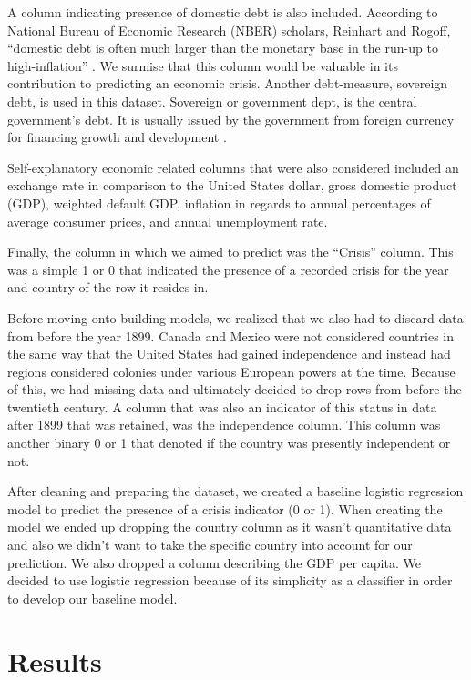 \documentclass[12pt]{article}
\begin{document}
A column indicating presence of domestic debt is also included. According to National Bureau of Economic Research (NBER) scholars, Reinhart and Rogoff, “domestic debt is often much larger than the monetary base in the run-up to high-inflation” \cite{nber}. We surmise that this column would be valuable in its contribution to predicting an economic crisis. Another debt-measure, sovereign debt, is used in this dataset. Sovereign or government dept, is the central government's debt. It is usually issued by the government from foreign currency for financing growth and development \cite{chensovereign}.

Self-explanatory economic related columns that were also considered included an exchange rate in comparison to the United States dollar, gross domestic product (GDP), weighted default GDP, inflation in regards to annual percentages of average consumer prices, and annual unemployment rate. 

Finally, the column in which we aimed to predict was the “Crisis” column. This was a simple 1 or 0 that indicated the presence of a recorded crisis for the year and country of the row it resides in.

Before moving onto building models, we realized that we also had to discard data from before the year 1899. Canada and Mexico were not considered countries in the same way that the United States had gained independence and instead had regions considered colonies under various European powers at the time. Because of this, we had missing data and ultimately decided to drop rows from before the twentieth century. A column that was also an indicator of this status in data after 1899 that was retained, was the independence column. This column was another binary 0 or 1 that denoted if the country was presently independent or not.

After cleaning and preparing the dataset, we created a baseline logistic regression model to predict the presence of a crisis indicator (0 or 1). When creating the model we ended up dropping the country column as it wasn’t quantitative data and also we didn’t want to take the specific country into account for our prediction. We also dropped a column describing the GDP per capita. We decided to use logistic regression because of its simplicity as a classifier in order to develop our baseline model.



\section{Results}
\end{document}
